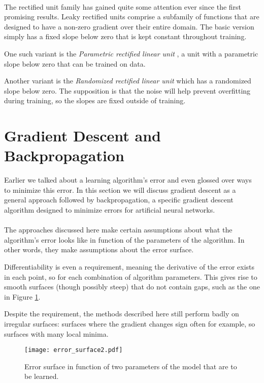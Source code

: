 \paragraph{}
The rectified unit family has gained quite some attention
ever since the first promising results.
Leaky rectified units comprise a subfamily
of functions that are designed to have a non-zero
gradient over their entire domain.
The basic version simply
has a fixed slope below zero
that is kept constant throughout training.

One such variant is the
\textit{Parametric rectified linear unit}
\parencite{He2015a},
a unit with a parametric slope below zero
that can be trained on data.

Another variant is the
\textit{Randomized rectified linear unit}
which has a randomized slope below zero.
The supposition is that the noise
will help prevent overfitting during training,
so the slopes are fixed outside of training.


\section{Gradient Descent and Backpropagation}
\label{sec:backprop}
Earlier we talked about a learning algorithm's error
and even glossed over ways to minimize this error.
In this section we will discuss gradient descent
as a general approach
followed by backpropagation,
a specific gradient descent algorithm
designed to minimize errors
for artificial neural networks.

\paragraph{}
The approaches discussed here
make certain assumptions about
what the algorithm's error looks like
in function of the parameters of the algorithm.
In other words, they make assumptions
about the error surface.

Differentiability is even a requirement,
meaning the derivative of the error
exists in each point,
so for each combination of algorithm parameters.
This gives rise to smooth surfaces
(though possibly steep)
that do not contain gaps,
such as the one in
Figure \ref{fig:error_surface}.

Despite the requirement,
the methods described here still perform badly
on irregular surfaces:
surfaces where the gradient changes sign often for example,
so surfaces with many local minima.

\begin{figure}[ht]
  \centering
  \texttt{[image: error\_surface2.pdf]}
  \caption[Error surface]{Error surface in function of two parameters of the model
  that are to be learned.}
  \label{fig:error_surface}
\end{figure}

